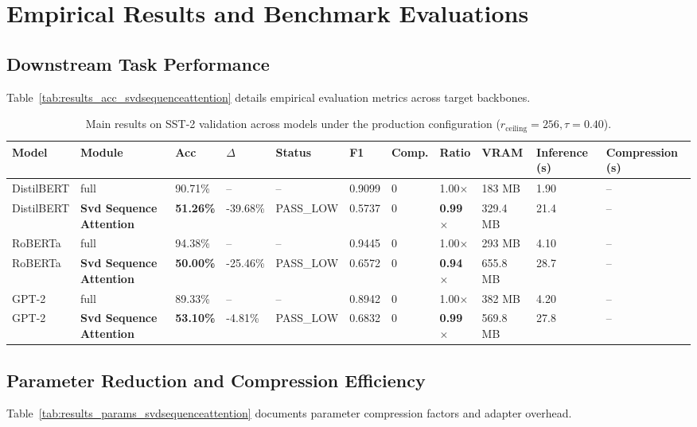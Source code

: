 \section{Empirical Results and Benchmark Evaluations}

\subsection{Downstream Task Performance}
Table~\ref{tab:results_acc_svdsequenceattention} details empirical evaluation metrics across target backbones.

\begin{table}[t]
\centering
\small
\begin{tabular}{lllllllllll}
\toprule
\textbf{Model} & \textbf{Module} & \textbf{Acc} & \textbf{$\Delta$} & \textbf{Status} & \textbf{F1} & \textbf{Comp.} & \textbf{Ratio} & \textbf{VRAM} & \textbf{Inference (s)} & \textbf{Compression (s)} \\
\midrule
DistilBERT & full & 90.71\% & -- & -- & 0.9099 & 0 & 1.00$\times$ & 183 MB & 1.90 & -- \\
DistilBERT & \textbf{Svd Sequence Attention} & \textbf{51.26\%} & -39.68\% & PASS_LOW & 0.5737 & 0 & \textbf{0.99$\times$} & 329.4 MB & 21.4 & -- \\
RoBERTa & full & 94.38\% & -- & -- & 0.9445 & 0 & 1.00$\times$ & 293 MB & 4.10 & -- \\
RoBERTa & \textbf{Svd Sequence Attention} & \textbf{50.00\%} & -25.46\% & PASS_LOW & 0.6572 & 0 & \textbf{0.94$\times$} & 655.8 MB & 28.7 & -- \\
GPT-2 & full & 89.33\% & -- & -- & 0.8942 & 0 & 1.00$\times$ & 382 MB & 4.20 & -- \\
GPT-2 & \textbf{Svd Sequence Attention} & \textbf{53.10\%} & -4.81\% & PASS_LOW & 0.6832 & 0 & \textbf{0.99$\times$} & 569.8 MB & 27.8 & -- \\
\bottomrule
\end{tabular}
\caption{Main results on SST-2 validation across models under the production configuration ($r_{\mathrm{ceiling}}=256, \tau=0.40$).}
\label{tab:main_sst2}
\end{table}

\subsection{Parameter Reduction and Compression Efficiency}
Table~\ref{tab:results_params_svdsequenceattention} documents parameter compression factors and adapter overhead.

